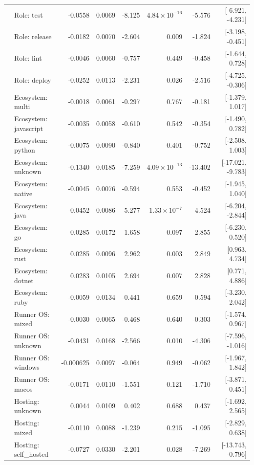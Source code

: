 \documentclass{article}
\begin{document}
\begin{longtable}{>{\raggedright\arraybackslash}p{2.4cm}>{\raggedright\arraybackslash}p{3.8cm}rrrrrr}
 & Role: test & -0.0558 & 0.0069 & -8.125 & $4.84\times10^{-16}$ & -5.576 & [-6.921, -4.231] \\
 & Role: release & -0.0182 & 0.0070 & -2.604 & 0.009 & -1.824 & [-3.198, -0.451] \\
 & Role: lint & -0.0046 & 0.0060 & -0.757 & 0.449 & -0.458 & [-1.644, 0.728] \\
 & Role: deploy & -0.0252 & 0.0113 & -2.231 & 0.026 & -2.516 & [-4.725, -0.306] \\
 & Ecosystem: multi & -0.0018 & 0.0061 & -0.297 & 0.767 & -0.181 & [-1.379, 1.017] \\
 & Ecosystem: javascript & -0.0035 & 0.0058 & -0.610 & 0.542 & -0.354 & [-1.490, 0.782] \\
 & Ecosystem: python & -0.0075 & 0.0090 & -0.840 & 0.401 & -0.752 & [-2.508, 1.003] \\
 & Ecosystem: unknown & -0.1340 & 0.0185 & -7.259 & $4.09\times10^{-13}$ & -13.402 & [-17.021, -9.783] \\
 & Ecosystem: native & -0.0045 & 0.0076 & -0.594 & 0.553 & -0.452 & [-1.945, 1.040] \\
 & Ecosystem: java & -0.0452 & 0.0086 & -5.277 & $1.33\times10^{-7}$ & -4.524 & [-6.204, -2.844] \\
 & Ecosystem: go & -0.0285 & 0.0172 & -1.658 & 0.097 & -2.855 & [-6.230, 0.520] \\
 & Ecosystem: rust & 0.0285 & 0.0096 & 2.962 & 0.003 & 2.849 & [0.963, 4.734] \\
 & Ecosystem: dotnet & 0.0283 & 0.0105 & 2.694 & 0.007 & 2.828 & [0.771, 4.886] \\
 & Ecosystem: ruby & -0.0059 & 0.0134 & -0.441 & 0.659 & -0.594 & [-3.230, 2.042] \\
 & Runner OS: mixed & -0.0030 & 0.0065 & -0.468 & 0.640 & -0.303 & [-1.574, 0.967] \\
 & Runner OS: unknown & -0.0431 & 0.0168 & -2.566 & 0.010 & -4.306 & [-7.596, -1.016] \\
 & Runner OS: windows & -0.000625 & 0.0097 & -0.064 & 0.949 & -0.062 & [-1.967, 1.842] \\
 & Runner OS: macos & -0.0171 & 0.0110 & -1.551 & 0.121 & -1.710 & [-3.871, 0.451] \\
 & Hosting: unknown & 0.0044 & 0.0109 & 0.402 & 0.688 & 0.437 & [-1.692, 2.565] \\
 & Hosting: mixed & -0.0110 & 0.0088 & -1.239 & 0.215 & -1.095 & [-2.829, 0.638] \\
 & Hosting: self\_hosted & -0.0727 & 0.0330 & -2.201 & 0.028 & -7.269 & [-13.743, -0.796] \\

\end{longtable}
\end{document}
